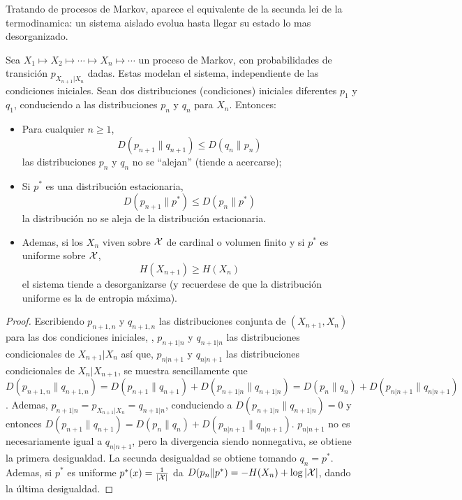 

Tratando de procesos  de Markov, aparece el equivalente de la  secunda lei de la
termodinamica:  un  sistema  aislado  evolua  hasta  llegar  su  estado  lo  mas
desorganizado.

\begin{lema}
  Sea $X_1 \mapsto X_2 \mapsto \cdots  \mapsto X_n \mapsto \cdots$ un proceso de
  Markov,  con probabilidades  de transici\'on  $p_{X_{n+1}|X_n}$  dadas.  Estas
  modelan  el sistema,  independiente de  las condiciones  iniciales.   Sean dos
  distribuciones (condiciones) iniciales diferentes $p_1$ y $q_1$, conduciendo a
  las distribuciones $p_n$ y $q_n$ para $X_n$. Entonces:
%
\begin{itemize}
\item  Para cualquier  $n \ge  1$,
  \[
  D(p_{n+1}\|q_{n+1}) \le D(q_n\|p_n)
  \]
  las distribuciones $p_n$ y $q_n$ no se ``alejan'' (tiende a acercarse);
%
\item  Si  $p^*$  es  una  distribuci\'on  estacionaria,
  \[
  D(p_{n+1}\|p^*) \le D(p_n\|p^*)
  \]
  la distribuci\'on no se aleja de la distribuci\'on estacionaria.
%
\item Ademas, si  los $X_n$ viven sobre  $\mathcal{X}$ de cardinal o volumen  finito y si
  $p^*$ es  uniforme sobre $\mathcal{X}$,
  \[
  H(X_{n+1}) \ge H(X_n)
  \]
  el  sistema tiende  a desorganizarse  (y recuerdese  de que  la distribuci\'on
  uniforme es la de entropia m\'axima).
\end{itemize}
\end{lema}
%
\begin{proof}
  Escribiendo   $p_{n+1,n}$  y  $q_{n+1,n}$   las  distribuciones   conjunta  de
  $(X_{n+1},X_n)$  para   las  dos   condiciones  iniciales,  ,   $p_{n+1|n}$  y
  $q_{n+1|n}$  las  distribuciones  condicionales  de $X_{n+1}|X_n$  as\'i  que,
  $p_{n|n+1}$ y  $q_{n|n+1}$ las distribuciones  condicionales de $X_n|X_{n+1}$,
  se muestra sencillamente  que $D(p_{n+1,n}\|q_{n+1,n}) = D(p_{n+1}\|q_{n+1}) +
  D(p_{n+1|n}\|q_{n+1|n})  =  D(p_n\|q_n)  +  D(p_{n|n+1}\|q_{n|n+1})$.  Ademas,
  $p_{n+1|n}     =    p_{X_{n+1}|X_n}     =     q_{n+1|n}$,    conduciendo     a
  $D(p_{n+1|n}\|q_{n+1|n}) = 0$ y  entonces $D(p_{n+1}\|q_{n+1}) = D(p_n\|q_n) +
  D(p_{n|n+1}\|q_{n|n+1})$.   $p_{n|n+1}$   no   es   necesariamente   igual   a
  $q_{n|n+1}$,  pero la divergencia  siendo nonnegativa,  se obtiene  la primera
  desigualdad.  La secunda desigualdad se  obtiene tomando $q_n = p^*$.  Ademas,
  si $p^*$  es uniforme  $p^*(x) = \frac{1}{|\mathcal{X}|}$  da $D(p_n\|p^*) =  -H(X_n) +
  \log |\mathcal{X}|$, dando la \'ultima desigualdad.
\end{proof}


